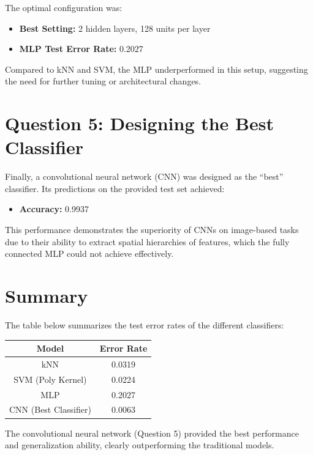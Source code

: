 \documentclass[a4paper,12pt]{article}
\begin{document}
\noindent The optimal configuration was:

\begin{itemize}
  \item \textbf{Best Setting:} 2 hidden layers, 128 units per layer
  \item \textbf{MLP Test Error Rate:} 0.2027
\end{itemize}

Compared to kNN and SVM, the MLP underperformed in this setup, suggesting the need for further tuning or architectural changes.

\section*{Question 5: Designing the Best Classifier}
Finally, a convolutional neural network (CNN) was designed as the ``best'' classifier. Its predictions on the provided test set achieved:

\begin{itemize}
  \item \textbf{Accuracy:} 0.9937
\end{itemize}

This performance demonstrates the superiority of CNNs on image-based tasks due to their ability to extract spatial hierarchies of features, which the fully connected MLP could not achieve effectively.

\section*{Summary}
The table below summarizes the test error rates of the different classifiers:

\begin{center}
\begin{tabular}{|c|c|}
\hline
\textbf{Model} & \textbf{Error Rate} \\
\hline
kNN & 0.0319 \\
SVM (Poly Kernel) & 0.0224 \\
MLP & 0.2027 \\
CNN (Best Classifier) & 0.0063 \\
\hline
\end{tabular}
\end{center}

The convolutional neural network (Question 5) provided the best performance and generalization ability, clearly outperforming the traditional models.
\end{document}
